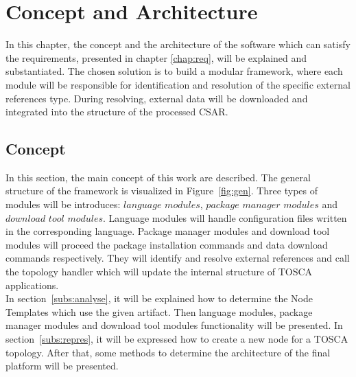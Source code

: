 
\chapter{Concept and Architecture}\label{chap:conarch}
In this chapter, the concept and the architecture of the software which can satisfy the requirements, presented in chapter \ref{chap:req}, will be explained and substantiated.
The chosen solution is to build a modular framework, where each module will be responsible for identification and resolution of the specific external references type.
During resolving, external data will be downloaded and integrated into the structure of the processed CSAR.
\section{Concept}
In this section, the main concept of this work are described.
The general structure of the framework is visualized in Figure~\ref{fig:gen}. 
Three types of modules will be introduces: $language$ $modules$, $package$ $manager$ $modules$ and $download$ $tool$ $modules$.
Language modules will handle configuration files written in the corresponding language.
Package manager modules and download tool modules will proceed the package installation commands and data download commands respectively.
They will identify and resolve external references and call the topology handler which will update the internal structure of TOSCA applications. \\
In section~\ref{subs:analyse}, it will be explained how to determine the Node Templates which use the given artifact.
Then language modules, package manager modules and download tool modules functionality will be presented.
In section~\ref{subs:repres}, it will be expressed how to create a new node for a TOSCA topology. 
After that, some methods to determine the architecture of the final platform will be presented.


